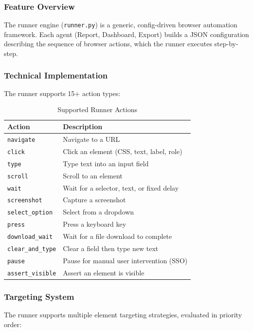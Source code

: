 \documentclass[12pt,a4paper]{article}
\begin{document}
\subsubsection{Feature Overview}
The runner engine (\texttt{runner.py}) is a generic, config-driven browser automation framework. Each agent (Report, Dashboard, Export) builds a JSON configuration describing the sequence of browser actions, which the runner executes step-by-step.

\subsubsection{Technical Implementation}
The runner supports 15+ action types:

\begin{table}[H]
\centering
\caption{Supported Runner Actions}
\label{tab:runner-actions}
\begin{tabularx}{\textwidth}{l X}
\toprule
\textbf{Action} & \textbf{Description} \\
\midrule
\texttt{navigate} & Navigate to a URL \\
\texttt{click} & Click an element (CSS, text, label, role) \\
\texttt{type} & Type text into an input field \\
\texttt{scroll} & Scroll to an element \\
\texttt{wait} & Wait for a selector, text, or fixed delay \\
\texttt{screenshot} & Capture a screenshot \\
\texttt{select\_option} & Select from a dropdown \\
\texttt{press} & Press a keyboard key \\
\texttt{download\_wait} & Wait for a file download to complete \\
\texttt{clear\_and\_type} & Clear a field then type new text \\
\texttt{pause} & Pause for manual user intervention (SSO) \\
\texttt{assert\_visible} & Assert an element is visible \\
\bottomrule
\end{tabularx}
\end{table}

\subsubsection{Targeting System}
The runner supports multiple element targeting strategies, evaluated in priority order:
\end{document}
